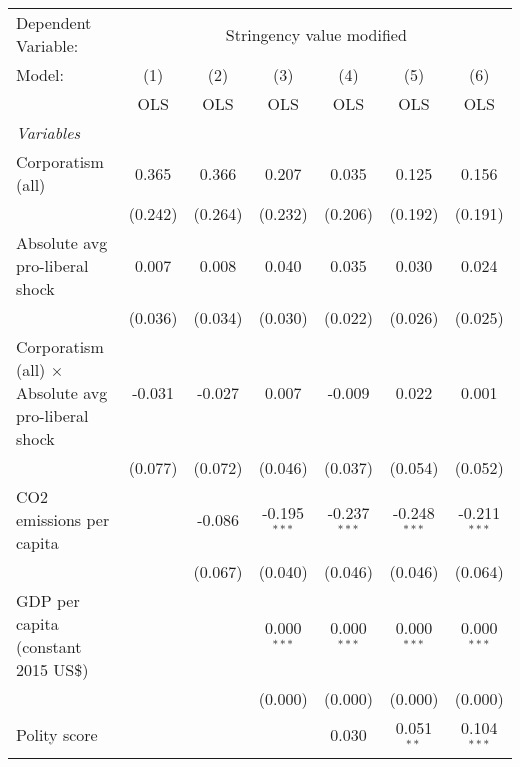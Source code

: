 
\begingroup
\centering
\begin{tabular}{lcccccc}
   \toprule
   Dependent Variable: & \multicolumn{6}{c}{Stringency value modified}\\
   Model:                                                     & (1)     & (2)     & (3)            & (4)            & (5)            & (6)\\  
                                                              &  OLS    & OLS     & OLS            & OLS            & OLS            & OLS\\  
   \midrule
   \emph{Variables}\\
   Corporatism (all)                                          & 0.365   & 0.366   & 0.207          & 0.035          & 0.125          & 0.156\\   
                                                              & (0.242) & (0.264) & (0.232)        & (0.206)        & (0.192)        & (0.191)\\   
   Absolute avg pro-liberal shock                             & 0.007   & 0.008   & 0.040          & 0.035          & 0.030          & 0.024\\   
                                                              & (0.036) & (0.034) & (0.030)        & (0.022)        & (0.026)        & (0.025)\\   
   Corporatism (all) $\times$ Absolute avg pro-liberal shock  & -0.031  & -0.027  & 0.007          & -0.009         & 0.022          & 0.001\\   
                                                              & (0.077) & (0.072) & (0.046)        & (0.037)        & (0.054)        & (0.052)\\   
   CO2 emissions per capita                                   &         & -0.086  & -0.195$^{***}$ & -0.237$^{***}$ & -0.248$^{***}$ & -0.211$^{***}$\\   
                                                              &         & (0.067) & (0.040)        & (0.046)        & (0.046)        & (0.064)\\   
   GDP per capita (constant 2015 US\$)                        &         &         & 0.000$^{***}$  & 0.000$^{***}$  & 0.000$^{***}$  & 0.000$^{***}$\\   
                                                              &         &         & (0.000)        & (0.000)        & (0.000)        & (0.000)\\   
   Polity score                                               &         &         &                & 0.030          & 0.051$^{**}$   & 0.104$^{***}$\\   

\end{tabular}
